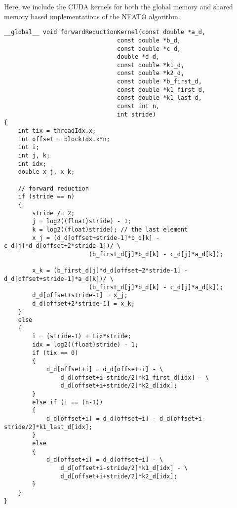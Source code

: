 Here, we include the CUDA kernels
for both the global memory and shared memory based
implementations of the NEATO algorithm.

\begin{verbatim}
__global__ void forwardReductionKernel(const double *a_d,
                                const double *b_d,
                                const double *c_d,
                                double *d_d,
                                const double *k1_d,
                                const double *k2_d,
                                const double *b_first_d,
                                const double *k1_first_d,
                                const double *k1_last_d,
                                const int n,
                                int stride)
{
    int tix = threadIdx.x;
    int offset = blockIdx.x*n;
    int i;
    int j, k;
    int idx;
    double x_j, x_k;

    // forward reduction
    if (stride == n)
    {
        stride /= 2;
        j = log2((float)stride) - 1;
        k = log2((float)stride); // the last element
        x_j = (d_d[offset+stride-1]*b_d[k] - c_d[j]*d_d[offset+2*stride-1])/ \
                        (b_first_d[j]*b_d[k] - c_d[j]*a_d[k]);

        x_k = (b_first_d[j]*d_d[offset+2*stride-1] - d_d[offset+stride-1]*a_d[k])/ \
                        (b_first_d[j]*b_d[k] - c_d[j]*a_d[k]);
        d_d[offset+stride-1] = x_j;
        d_d[offset+2*stride-1] = x_k;
    }
    else
    {
        i = (stride-1) + tix*stride;
        idx = log2((float)stride) - 1;
        if (tix == 0)
        {
            d_d[offset+i] = d_d[offset+i] - \
                d_d[offset+i-stride/2]*k1_first_d[idx] - \
                d_d[offset+i+stride/2]*k2_d[idx];
        }
        else if (i == (n-1))
        {
            d_d[offset+i] = d_d[offset+i] - d_d[offset+i-stride/2]*k1_last_d[idx];
        }
        else
        {
            d_d[offset+i] = d_d[offset+i] - \
                d_d[offset+i-stride/2]*k1_d[idx] - \
                d_d[offset+i+stride/2]*k2_d[idx];
        }
    }
}
\end{verbatim}

